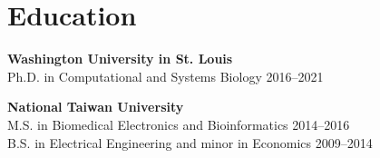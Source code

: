 \section{Education}

\begin{entrylist}

\item \textbf{Washington University in St. Louis} \\
    Ph.D. in Computational and Systems Biology \hfill
    2016--2021

\item \textbf{National Taiwan University} \\
    M.S. in Biomedical Electronics and
    Bioinformatics \hfill 2014--2016 \\
    B.S. in Electrical Engineering and
    minor in Economics \hfill 2009--2014

\end{entrylist}
